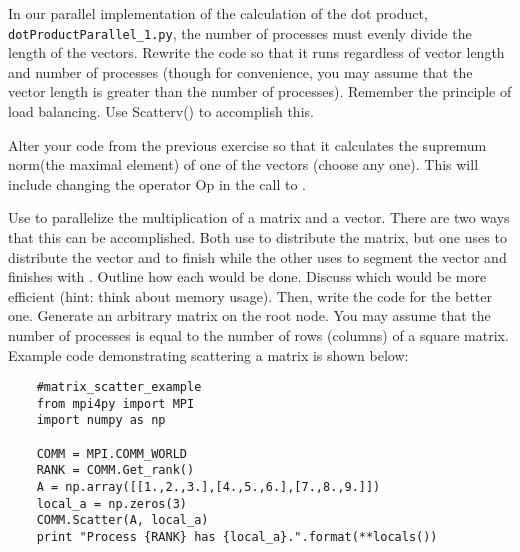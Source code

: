 \begin{problem}
  In our parallel implementation of the calculation of the dot product, \texttt{dotProductParallel\_1.py}, the number of processes must evenly divide the length of the vectors. Rewrite the code so that it runs regardless of vector length and number of processes (though for convenience, you may assume that the vector length is greater than the number of processes). Remember the principle of load balancing. Use Scatterv() to accomplish this.


\end{problem}

\begin{problem}
  Alter your code from the previous exercise so that it calculates the supremum norm(the maximal element) of one of the vectors (choose any one). This will include changing the operator Op in the call to .
\end{problem}

\begin{problem}
  Use  to parallelize the multiplication of a matrix and a vector. There are two ways that this can be accomplished. Both use  to distribute the matrix, but one uses  to distribute the vector and  to finish while the other uses  to segment the vector and finishes with . Outline how each would be done. Discuss which would be more efficient (hint: think about memory usage). Then, write the code for the better one. Generate an arbitrary matrix on the root node. You may assume that the number of processes is equal to the number of rows (columns) of a square matrix. Example code demonstrating scattering a matrix is shown below:

  \begin{lstlisting}
    #matrix_scatter_example
    from mpi4py import MPI
    import numpy as np

    COMM = MPI.COMM_WORLD
    RANK = COMM.Get_rank()
    A = np.array([[1.,2.,3.],[4.,5.,6.],[7.,8.,9.]])
    local_a = np.zeros(3)
    COMM.Scatter(A, local_a)
    print "Process {RANK} has {local_a}.".format(**locals())
  \end{lstlisting}
\end{problem}

